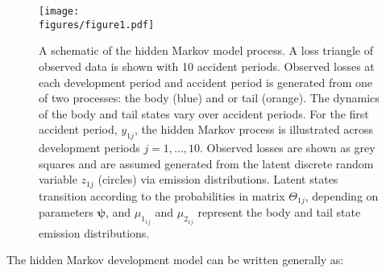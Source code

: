 \begin{figure}[t!]
    \centering
    \texttt{[image: \\figures/figure1.pdf]}
    \caption{
        A schematic of the hidden Markov model process.
        A loss triangle of observed data is shown
        with 10 accident periods. Observed losses
        at each development period and accident period
        is generated from one of
        two processes: the body (blue)
        and or tail (orange). The dynamics of the
        body and tail states vary over accident periods.
        For the first accident period, $y_{1j}$,
        the hidden Markov process is illustrated
        across development periods $j = 1, ..., 10$.
        Observed losses are shown as grey
        squares and are assumed generated from the latent
        discrete random variable $z_{1j}$ (circles) via
        emission distributions.
        Latent states transition according
        to the probabilities
        in matrix $\Theta_{1j}$, depending on parameters
        $\bm{\psi}$, and $\mu_{1_{1j}}$ and $\mu_{2_{1j}}$
        represent the body and tail state emission distributions.
   }
	\label{fig:schematic}
\end{figure}

The hidden Markov development model can be
written generally as:

